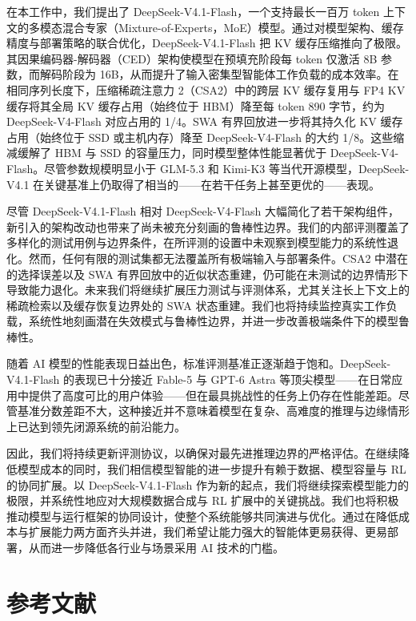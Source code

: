 \documentclass[
  10
]{article}
\begin{document}
在本工作中，我们提出了 DeepSeek-V4.1-Flash，一个支持最长一百万 token 上下文的多模态混合专家（Mixture-of-Experts，MoE）模型。通过对模型架构、缓存精度与部署策略的联合优化，DeepSeek-V4.1-Flash 把 KV 缓存压缩推向了极限。其因果编码器-解码器（CED）架构使模型在预填充阶段每 token 仅激活 8B 参数，而解码阶段为 16B，从而提升了输入密集型智能体工作负载的成本效率。在相同序列长度下，压缩稀疏注意力 2（CSA2）中的跨层 KV 缓存复用与 FP4 KV 缓存将其全局 KV 缓存占用（始终位于 HBM）降至每 token 890 字节，约为 DeepSeek-V4-Flash 对应占用的 1/4。SWA 有界回放进一步将其持久化 KV 缓存占用（始终位于 SSD 或主机内存）降至 DeepSeek-V4-Flash 的大约 1/8。这些缩减缓解了 HBM 与 SSD 的容量压力，同时模型整体性能显著优于 DeepSeek-V4-Flash。尽管参数规模明显小于 GLM-5.3 和 Kimi-K3 等当代开源模型，DeepSeek-V4.1 在关键基准上仍取得了相当的——在若干任务上甚至更优的——表现。

尽管 DeepSeek-V4.1-Flash 相对 DeepSeek-V4-Flash 大幅简化了若干架构组件，新引入的架构改动也带来了尚未被充分刻画的鲁棒性边界。我们的内部评测覆盖了多样化的测试用例与边界条件，在所评测的设置中未观察到模型能力的系统性退化。然而，任何有限的测试集都无法覆盖所有极端输入与部署条件。CSA2 中潜在的选择误差以及 SWA 有界回放中的近似状态重建，仍可能在未测试的边界情形下导致能力退化。未来我们将继续扩展压力测试与评测体系，尤其关注长上下文上的稀疏检索以及缓存恢复边界处的 SWA 状态重建。我们也将持续监控真实工作负载，系统性地刻画潜在失效模式与鲁棒性边界，并进一步改善极端条件下的模型鲁棒性。

随着 AI 模型的性能表现日益出色，标准评测基准正逐渐趋于饱和。DeepSeek-V4.1-Flash 的表现已十分接近 Fable-5 与 GPT-6 Astra 等顶尖模型——在日常应用中提供了高度可比的用户体验——但在最具挑战性的任务上仍存在性能差距。尽管基准分数差距不大，这种接近并不意味着模型在复杂、高难度的推理与边缘情形上已达到领先闭源系统的前沿能力。

因此，我们将持续更新评测协议，以确保对最先进推理边界的严格评估。在继续降低模型成本的同时，我们相信模型智能的进一步提升有赖于数据、模型容量与 RL 的协同扩展。以 DeepSeek-V4.1-Flash 作为新的起点，我们将继续探索模型能力的极限，并系统性地应对大规模数据合成与 RL 扩展中的关键挑战。我们也将积极推动模型与运行框架的协同设计，使整个系统能够共同演进与优化。通过在降低成本与扩展能力两方面齐头并进，我们希望让能力强大的智能体更易获得、更易部署，从而进一步降低各行业与场景采用 AI 技术的门槛。



\section*{参考文献}\label{references}
\end{document}
